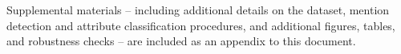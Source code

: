 Supplemental materials -- including additional details on the dataset, mention detection and attribute classification procedures, and additional figures, tables, and robustness checks -- are included as an appendix to this document.
